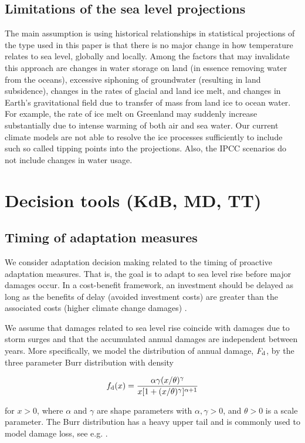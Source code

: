 \documentclass[draft,linenumbers]{agujournal}
\begin{document}
\subsection{Limitations of the sea level projections}
The main assumption is using historical relationships in statistical projections of the type used in this paper is that there is no major change in how temperature relates to sea level, globally and locally. Among the factors that may invalidate this approach are changes in water storage on land (in essence removing water from the oceans), excessive siphoning of groundwater (resulting in land subsidence), changes in the rates of glacial and land ice melt, and changes in Earth's gravitational field due to transfer of mass from land ice to ocean water. For example, the rate of ice melt on Greenland may suddenly increase substantially due to intense warming of both air and sea water. Our current climate models are not able to resolve the ice processes sufficiently to include such so called tipping points into the projections. Also, the IPCC scenarios \citep{change} do not include changes in water usage.

\section{Decision tools {\color{blue} (KdB, MD, TT)}}
\label{decision_tools}

\subsection{Timing of adaptation measures}

We consider adaptation decision making related to the timing of proactive adaptation measures. That is, the goal is to adapt to sea level rise before major damages occur. In a cost-benefit framework, an investment should be delayed as long as the benefits of delay (avoided investment costs) are greater than the associated costs (higher climate change damages) \citep{Fankhauser&1999}.

We assume that damages related to sea level rise coincide with damages due to storm surges and that the accumulated annual damages are independent between years. More specifically, we model the distribution of annual damage, $F_{\textup{d}}$, by the three parameter Burr distribution \citep{Burr1942} with density
\begin{linenomath*}
  \begin{equation}\label{eq:Burr}
  f_{\textup{d}} (x) = \frac{\alpha \gamma (x/ \theta)^{\gamma}}{x [ 1 + (x/ \theta)^{\gamma}]^{\alpha + 1}}
  \end{equation}
\end{linenomath*}
for $x > 0$, where $\alpha$ and $\gamma$ are shape parameters with $\alpha, \gamma > 0$, and $\theta >0$ is a scale parameter. The Burr distribution has a heavy upper tail and is commonly used to model damage loss, see e.g. \cite{Klugman&2012}.
\end{document}
